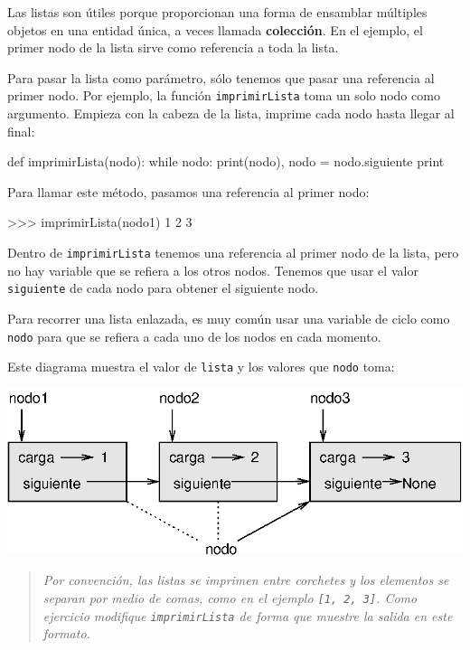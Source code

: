 
Las listas son útiles porque proporcionan una forma de ensamblar múltiples
objetos en una entidad única, a veces llamada \textbf{colección}.
En el ejemplo, el primer nodo de la lista sirve como referencia a
toda la lista.

 

Para pasar la lista como parámetro, sólo tenemos que pasar una referencia
al primer nodo. Por ejemplo, la función \texttt{imprimirLista} toma
un solo nodo como argumento. Empieza con la cabeza de la lista, imprime
cada nodo hasta llegar al final:

\beforeverb 
\begin{pythoncode}
def imprimirLista(nodo):
  while nodo:
    print(nodo),
    nodo = nodo.siguiente
  print
\end{pythoncode}
\afterverb Para llamar este método, pasamos una referencia al primer
nodo:

\beforeverb 
\begin{pyconcode}
>>> imprimirLista(nodo1)
1 2 3
\end{pyconcode}
\afterverb Dentro de \texttt{imprimirLista} tenemos una referencia
al primer nodo de la lista, pero no hay variable que se refiera a
los otros nodos. Tenemos que usar el valor \texttt{siguiente} de cada
nodo para obtener el siguiente nodo.

Para recorrer una lista enlazada, es muy común usar una variable de
ciclo como \texttt{nodo} para que se refiera a cada uno de los nodos
en cada momento.

  

Este diagrama muestra el valor de \texttt{lista} y los valores que
\texttt{nodo} toma:

\beforefig \centerline{\includegraphics{illustrations/link3}}
\afterfig
\begin{quote}
{\em Por convención, las listas se imprimen entre corchetes y los
elementos se separan por medio de comas, como en el ejemplo \texttt{{[}1,
2, 3{]}}. Como ejercicio modifique \texttt{imprimirLista} de forma
que muestre la salida en este formato.} 
\end{quote}

